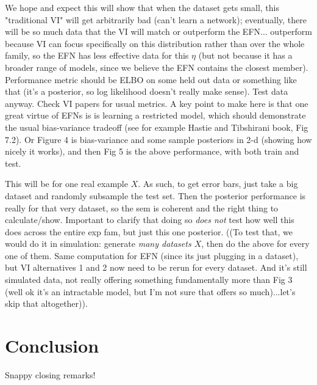 \documentclass{article}
\begin{document}
We hope and expect this will show that when the dataset gets small, this "traditional VI" will get arbitrarily bad (can't learn a network); eventually, there will be so much data that the VI will match or outperform the EFN... outperform because VI can focus specifically on this distribution rather than over the whole family, so the EFN has less effective data for this $\eta$ (but not because it has a broader range of models, since we believe the EFN contains the closest member).  Performance metric should be ELBO on some held out data or something like that (it's a posterior, so log likelihood doesn't really make sense).  Test data anyway.   Check VI papers for usual metrics.  A key point to make here is that one great virtue of EFNs is is learning a restricted model, which should demonstrate the usual bias-variance tradeoff (see for example Hastie and Tibshirani book, Fig 7.2). Or Figure 4 is bias-variance and some sample posteriors in 2-d (showing how nicely it works), and then Fig 5 is the above performance, with both train and test.   

This will be for one real example $X$.  As such, to get error bars, just take a big dataset and randomly subsample the test set.  Then the posterior performance is really for that very dataset, so the sem is coherent and the right thing to calculate/show.  Important to clarify that doing so \emph{does not} test how well this does across the entire exp fam, but just this one posterior.  ((To test that, we would do it in simulation: generate \emph{many datasets $X$}, then do the above for every one of them.  Same computation for EFN (since its just plugging in a dataset), but VI alternatives 1 and 2 now need to be rerun for every dataset.  And it's still simulated data, not really offering something fundamentally more than Fig 3 (well ok it's an intractable model, but I'm not sure that offers so much)...let's skip that altogether)).



\section{Conclusion}

Snappy closing remarks!

%
\end{document}
